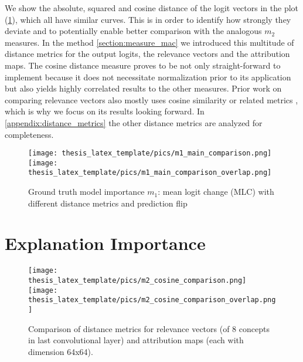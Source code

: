 We show the absolute, squared and cosine distance of the logit vectors in the plot (\cref{fig:m1_results}), which all have similar curves. This is in order to identify how strongly they deviate and to potentially enable better comparison with the analogous $m_2$ measures.
In the method \cref{section:measure_mac} we introduced this multitude of distance metrics for the output logits, the relevance vectors and the attribution maps. The cosine distance measure proves to be not only straight-forward to implement because it does not necessitate normalization prior to its application but also yields highly correlated results to the other measures. 
Prior work on comparing relevance vectors also mostly uses cosine similarity or related metrics \citep{Sixt2020, Achtibat2022,Achtibat2023, Dreyer2023a}, which is why we focus on its results looking forward.  
In \cref{appendix:distance_metrics} the other distance metrics are analyzed for completeness.

\begin{figure}[t!]
    \centering
    \texttt{[image: thesis\_latex\_template/pics/m1\_main\_comparison.png]}
    \texttt{[image: thesis\_latex\_template/pics/m1\_main\_comparison\_overlap.png]}
    \caption[Ground Truth Importance $m_1$]{Ground truth model importance $m_1$: mean logit change (MLC) with different distance metrics and prediction flip}
    \label{fig:m1_results}
\end{figure}

\section{Explanation Importance}

\begin{figure}[t!]
    \centering
    \texttt{[image: thesis\_latex\_template/pics/m2\_cosine\_comparison.png]}
    \texttt{[image: thesis\_latex\_template/pics/m2\_cosine\_comparison\_overlap.png]}
    \caption[Relevance Vectors and Attribution Maps, Comparison of Metrics]{Comparison of distance metrics for relevance vectors (of 8 concepts in last convolutional layer) and attribution maps (each with dimension 64x64).}
    \label{fig:m2_cosine_comparison}
\end{figure}

